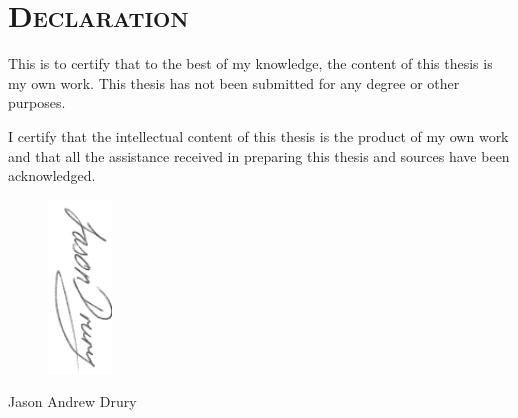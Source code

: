 \chapter*{\textsc{Declaration}}

\indent This is to certify that to the best of my knowledge, the content of this thesis is my own work. This thesis has not been submitted for any degree or other purposes.

\vspace{1cm}
\vspace{1cm}


I certify that the intellectual content of this thesis is the product of my own work and that all the assistance received in preparing this thesis and sources have been acknowledged.

\vspace{3cm}


\begin{figure}[hbtp]
\centering
\includegraphics[width=0.15\textwidth,angle=90]{Chapter_Preface/signature.png} %
\end{figure}
\begin{center}
Jason Andrew Drury
\end{center}
